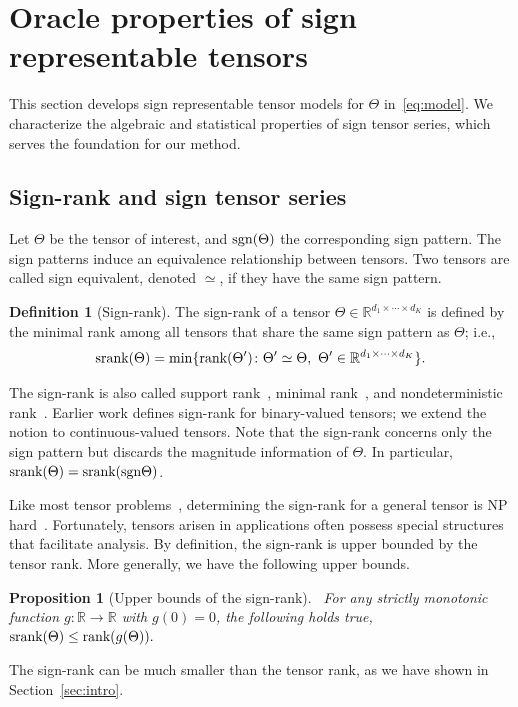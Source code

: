 \documentclass{article}
\theoremstyle{plain}
\newtheorem{prop}{Proposition}
\theoremstyle{definition}
\newtheorem{defn}{Definition}
\def\sign{\textup{sgn}}
\def\srank{\textup{srank}}
\def\rank{\textup{rank}}
\begin{document}
\section{Oracle properties of sign representable tensors}\label{sec:representation}
This section develops sign representable tensor models for $\Theta$ in~\eqref{eq:model}. We characterize the algebraic and statistical properties of sign tensor series, which serves the foundation for our method. 


\subsection{Sign-rank and sign tensor series}\label{sec:sign-rank}
Let $\Theta$ be the tensor of interest, and $\sign (\Theta)$ the corresponding sign pattern. The sign patterns induce an equivalence relationship between tensors. Two tensors are called sign equivalent, denoted $\simeq$, if they have the same sign pattern.

\begin{defn}[Sign-rank]
The sign-rank of a tensor $\Theta\in\mathbb{R}^{d_1\times \cdots \times d_K}$ is defined by the minimal rank among all tensors that share the same sign pattern as $\Theta$; i.e.,
\[
\srank(\Theta) = \min \{\rank(\Theta')\colon  \Theta'\simeq \Theta,\ \Theta'\in\mathbb{R}^{d_1\times \cdots \times d_K}\}.
\]
\end{defn}
The sign-rank is also called {support rank}~\citep{cohn2013fast}, {minimal rank}~\citep{alon2016sign}, and {nondeterministic rank}~\citep{de2003nondeterministic}. Earlier work defines sign-rank for binary-valued tensors; we extend the notion to continuous-valued tensors. Note that the sign-rank concerns only the sign pattern but discards the magnitude information of $\Theta$. In particular, $\srank(\Theta)=\srank(\sign \Theta)$. 

Like most tensor problems~\citep{hillar2013most}, determining the sign-rank for a general tensor is NP hard~\citep{alon2016sign}. Fortunately, tensors arisen in applications often possess special structures that facilitate analysis. By definition, the sign-rank is upper bounded by the tensor rank. More generally, we have the following upper bounds. 

\begin{prop}[Upper bounds of the sign-rank]~\label{cor:monotonic} For any strictly monotonic function $g\colon \mathbb{R}\to \mathbb{R}$ with $g(0)=0$,  the following holds true,
$\textup{srank}(\Theta)\leq\rank(g(\Theta)).$
\end{prop}
\vspace{-.1cm}
The sign-rank can be much smaller than the tensor rank, as we have shown in Section~\ref{sec:intro}.
\end{document}

